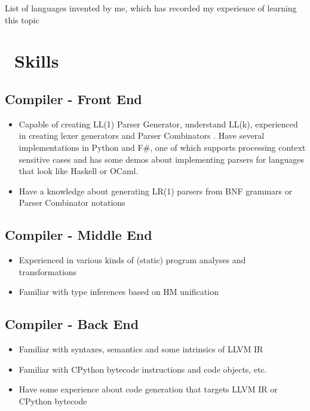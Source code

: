 \documentclass{resume}
\begin{document}
List of languages invented by me, which has recorded my experience of learning this topic


\section{\faCogs\ Skills}

\subsection{\textbf{Compiler - Front End}}
\begin{itemize}
  \item Capable of creating LL(1) Parser Generator, understand LL(k),  
        experienced in creating lexer generators and Parser Combinators
        . Have several implementations in Python and F\#, one of which supports
        processing context sensitive cases and has some demos about implementing parsers
        for languages that look like Haskell or OCaml.
  \item Have a knowledge about generating LR(1) parsers from BNF grammars or Parser Combinator notations
\end{itemize}

\subsection{\textbf{Compiler - Middle End}}
\begin{itemize}
  \item Experienced in various kinds of (static) program analyses and transformations
  \item Familiar with type inferences based on HM unification
\end{itemize}

\subsection{\textbf{Compiler - Back End}}
\begin{itemize}
  \item Familiar with syntaxes, semantics and some intrinsics of LLVM IR
  \item Familiar with CPython bytecode instructions and code objects, etc.
  \item Have some experience about code generation that targets LLVM IR or CPython bytecode
\end{itemize}
\end{document}
